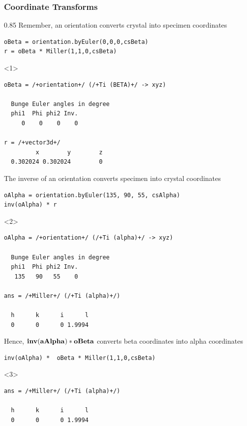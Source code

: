 \documentclass[compress,aspectratio=1610,fleqn]{beamer}
\begin{document}
\begin{frame}[fragile]
  \frametitle{Coordinate Transforms}

  \begin{overlayarea}{\textwidth}{0.85\textheight}
  Remember, an orientation converts crystal into specimen
  coordinates
  \vspace{-.2cm}
  \begin{lstlisting}[style=input]
oBeta = orientation.byEuler(0,0,0,csBeta)
r = oBeta * Miller(1,1,0,csBeta)
\end{lstlisting}
  \begin{onlyenv}<1>
\vspace{-.3cm}\begin{lstlisting}[style=output]
oBeta = /+orientation+/ (/+Ti (BETA)+/ -> xyz)

  Bunge Euler angles in degree
  phi1  Phi phi2 Inv.
     0    0    0    0

r = /+vector3d+/
         x        y        z
  0.302024 0.302024        0
\end{lstlisting}
  \end{onlyenv}

  \pause
  \medskip

  The inverse of an orientation converts specimen into crystal coordinates
  \vspace{-.2cm}
  \begin{lstlisting}[style=input]
oAlpha = orientation.byEuler(135, 90, 55, csAlpha)
inv(oAlpha) * r
\end{lstlisting}
  \begin{onlyenv}<2>
    \vspace{-.3cm}
    \begin{lstlisting}[style=output]
oAlpha = /+orientation+/ (/+Ti (alpha)+/ -> xyz)

  Bunge Euler angles in degree
  phi1  Phi phi2 Inv.
   135   90   55    0

ans = /+Miller+/ (/+Ti (alpha)+/)
   
  h      k      i      l
  0      0      0 1.9994
\end{lstlisting}
  \end{onlyenv}

  \pause
  \medskip

  Hence, $\text{\bf inv}(\mathbf{aAlpha}) * \mathbf{oBeta}$ converts beta
  coordinates into alpha coordinates
  \vspace{-.2cm}
    \begin{lstlisting}[style=input]
inv(oAlpha) *  oBeta * Miller(1,1,0,csBeta)
  \end{lstlisting}
  \begin{onlyenv}<3>
    \vspace{-.3cm}
    \begin{lstlisting}[style=output]
ans = /+Miller+/ (/+Ti (alpha)+/)

  h      k      i      l
  0      0      0 1.9994
\end{lstlisting}
  \end{onlyenv}

\end{overlayarea}

\end{frame}
\end{document}
